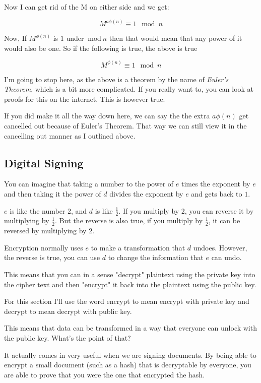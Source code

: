 \documentclass{article}
\newcommand{\inmod}{\ \text{mod}\ }
\begin{document}
  Now I can get rid of the M on either side and we get:

  \[ M^{a\phi(n)} \equiv 1 \mod n \]

  Now, If $M^{\phi(n)}$ is $1$ under $\inmod n$ then that would mean that any 
  power of it would also be one. So if the following is true, the above is true

  \[ M^{\phi(n)} \equiv 1 \mod n \]

  I'm going to stop here, as the above is a theorem by the name of 
  \textit{Euler's Theorem}, which is a bit more complicated. If you really want
  to, you can look at proofs for this on the internet. This is however true.

  If you did make it all the way down here, we can say the the extra $a\phi(n)$
  get cancelled out because of Euler's Theorem. That way we can still view
  it in the cancelling out manner as I outlined above.

  \subsection*{Digital Signing}
  You can imagine that taking a number to the power of $e$ times the exponent by
  $e$ and then taking it the power of $d$ divides the exponent by $e$ and gets
  back to $1$.

  $e$ is like the number 2, and $d$ is like $\frac{1}{2}$. If you multiply by 2, you
  can reverse it by multiplying by $\frac{1}{2}$. But the reverse is also true,
  if you multiply by $\frac{1}{2}$, it can be reversed by multiplying by $2$.

  Encryption normally uses $e$ to make a transformation that $d$ undoes.
  However, the reverse is true, you can use $d$ to change the information that $e$ can undo.

  This means that you can in a sense "decrypt" plaintext using the private key
  into the cipher text and then "encrypt" it back into the plaintext using the
  public key. 

  For this section I'll use the word encrypt to mean encrypt with private key and 
  decrypt to mean decrypt with public key.

  This means that data can be transformed in a way that
  everyone can unlock with the public key. What's the point of that?

  It actually comes in very useful when we are signing documents. By being able
  to encrypt a small document (such as a hash) that is decryptable by everyone, 
  you are able to prove that you were the one that encrypted the hash.
\end{document}
